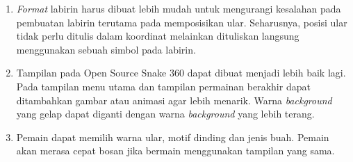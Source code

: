 \begin{enumerate}
	\item \textit{Format} labirin harus dibuat lebih mudah untuk mengurangi kesalahan pada pembuatan labirin terutama pada memposisikan ular. Seharusnya, posisi ular tidak perlu ditulis dalam koordinat melainkan dituliskan langsung menggunakan sebuah simbol pada labirin.
	\item Tampilan pada Open Source Snake 360 dapat dibuat menjadi lebih baik lagi. Pada tampilan menu utama dan tampilan permainan berakhir dapat ditambahkan gambar atau animasi agar lebih menarik. Warna \textit{background} yang gelap dapat diganti dengan warna \textit{background} yang lebih terang.
	\item Pemain dapat memilih warna ular, motif dinding dan jenis buah. Pemain akan merasa cepat bosan jika bermain menggunakan tampilan yang sama.
\end{enumerate}